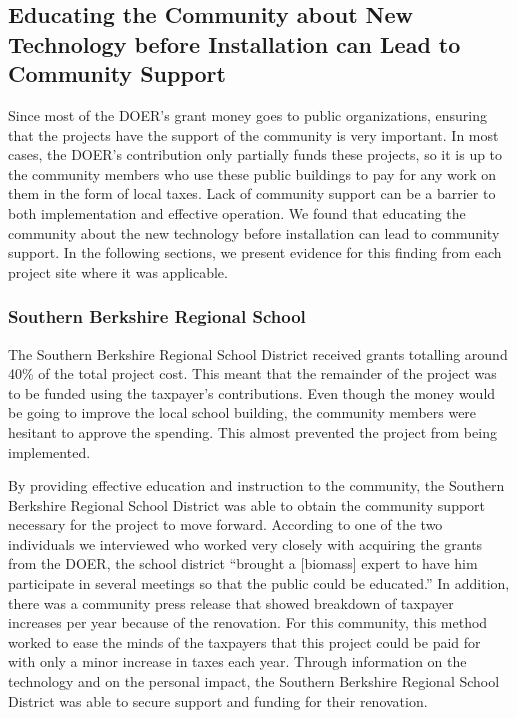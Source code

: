 \subsection{Educating the Community about New Technology before Installation can Lead to Community Support}
\par Since most of the DOER’s grant money goes to public organizations, ensuring that the projects have the support of the community is very important. In most cases, the DOER’s contribution only partially funds these projects, so it is up to the community members who use these public buildings to pay for any work on them in the form of local taxes. Lack of community support can be a barrier to both implementation and effective operation. We found that educating the community about the new technology before installation can lead to community support. In the following sections, we present evidence for this finding from each project site where it was applicable.

\subsubsection{Southern Berkshire Regional School}
\par The Southern Berkshire Regional School District received grants totalling around 40\% of the total project cost. This meant that the remainder of the project was to be funded using the taxpayer’s contributions. Even though the money would be going to improve the local school building, the community members were hesitant to approve the spending. This almost prevented the project from being implemented.
\par By providing effective education and instruction to the community, the Southern Berkshire Regional School District was able to obtain the community support necessary for the project to move forward. According to one of the two individuals we interviewed who worked very closely with acquiring the grants from the DOER, the school district “brought a [biomass] expert to have him participate in several meetings so that the public could be educated.” In addition, there was a community press release that showed breakdown of taxpayer increases per year because of the renovation. For this community, this method worked to ease the minds of the taxpayers that this project could be paid for with only a minor increase in taxes each year. Through information on the technology and on the personal impact, the Southern Berkshire Regional School District was able to secure support and funding for their renovation.

